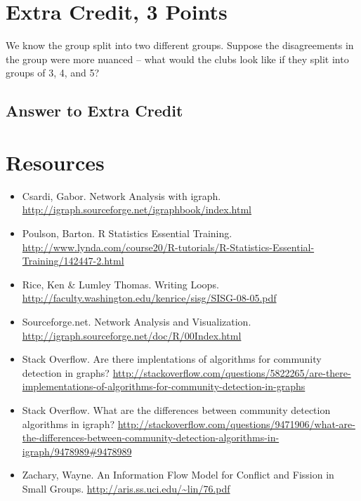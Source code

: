 \documentclass{article}
\begin{document}
\newpage

\section*{Extra Credit, 3 Points}

We know the group split into two different groups. Suppose the disagreements in the group were more nuanced -- what would the clubs look like if they split into groups of 3, 4, and 5?


\subsection*{Answer to Extra Credit}





\newpage

\section*{Resources}

\begin{itemize}
\item Csardi, Gabor. Network Analysis with igraph. \url{http://igraph.sourceforge.net/igraphbook/index.html}
\item Poulson, Barton. R Statistics Essential Training. \url{http://www.lynda.com/course20/R-tutorials/R-Statistics-Essential-Training/142447-2.html}
\item Rice, Ken \& Lumley Thomas. Writing Loops. \url{http://faculty.washington.edu/kenrice/sisg/SISG-08-05.pdf}
\item Sourceforge.net. Network Analysis and Visualization. \url{http://igraph.sourceforge.net/doc/R/00Index.html}
\item Stack Overflow. Are there implentations of algorithms for community detection in graphs? \url{http://stackoverflow.com/questions/5822265/are-there-implementations-of-algorithms-for-community-detection-in-graphs}
\item Stack Overflow. What are the differences between community detection algorithms in igraph? \url{http://stackoverflow.com/questions/9471906/what-are-the-differences-between-community-detection-algorithms-in-igraph/9478989#9478989}
\item Zachary, Wayne. An Information Flow Model for Conflict and Fission in Small Groups. \url{http://aris.ss.uci.edu/~lin/76.pdf}


\end{itemize}
\end{document}
